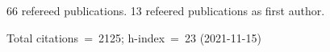 66 refereed publications. 13 refeered publications as first author.

Total citations~=~2125; h-index~=~23 (2021-11-15)